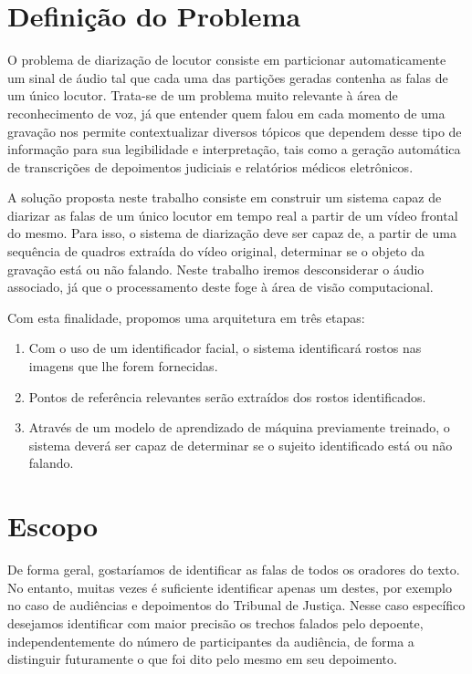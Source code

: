 \section{Definição do Problema}
\label{sec:problem-desc}

O problema de diarização de locutor consiste em particionar automaticamente um sinal de áudio tal que cada uma das partições geradas contenha as falas de um único locutor.
Trata-se de um problema muito relevante à área de reconhecimento de voz, já que entender quem falou em cada momento de uma gravação nos permite contextualizar diversos tópicos que dependem desse tipo de informação para sua legibilidade e interpretação, tais como a geração automática de transcrições de depoimentos judiciais e relatórios médicos eletrônicos.

A solução proposta neste trabalho consiste em construir um sistema capaz de diarizar as falas de um único locutor em tempo real a partir de um vídeo frontal do mesmo.
Para isso, o sistema de diarização deve ser capaz de, a partir de uma sequência de quadros extraída do vídeo original, determinar se o objeto da gravação está ou não falando. Neste trabalho iremos desconsiderar o áudio associado, já que o processamento deste foge à área de visão computacional.

Com esta finalidade, propomos uma arquitetura em três etapas:
\begin{enumerate}
    \item Com o uso de um identificador facial, o sistema identificará rostos nas imagens que lhe forem fornecidas. 
    \item Pontos de referência relevantes serão extraídos dos rostos identificados. 
    \item Através de um modelo de aprendizado de máquina previamente treinado, o sistema deverá ser capaz de determinar se o sujeito identificado está ou não falando.
\end{enumerate}

\section{Escopo}
\label{sec:scope}

De forma geral, gostaríamos de identificar as falas de todos os oradores do texto.
No entanto, muitas vezes é suficiente identificar apenas um destes, por exemplo no caso de audiências e depoimentos do Tribunal de Justiça.
Nesse caso específico desejamos identificar com maior precisão os trechos falados pelo depoente, independentemente do número de participantes da audiência, de forma a distinguir futuramente o que foi dito pelo mesmo em seu depoimento.


